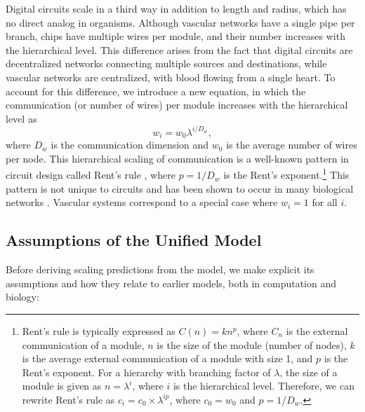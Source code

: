 \documentclass[12pt]{article}
\begin{document}
Digital circuits scale in a third way in addition to length and
radius, which has no direct 
analog in organisms. Although vascular networks have a single pipe per 
branch, chips have multiple wires per module, and their number 
increases with the hierarchical level. This difference arises from the 
fact that digital circuits are decentralized networks connecting 
multiple sources and destinations, while vascular networks are 
centralized, with blood flowing from a single heart. To account for 
this difference, we introduce a new equation, in which the 
communication (or number of wires) per module increases with the 
hierarchical level as
\begin{equation}
w_i = w_0 \lambda^{i/D_w},
\label{eq:communication}
\end{equation}
where $D_w$ is the communication dimension and $w_0$ is the average 
number of wires per node.  This hierarchical scaling of communication 
is a well-known pattern in circuit design called Rent's rule 
\cite{christie00}, where $p = 1/D_w$ is the Rent's
exponent.\footnote{Rent's rule is typically expressed as $C(n) = kn^p$, where $C_n$
  is the external communication of a module, $n$ is the size of the
  module (number of nodes), $k$ is the average external communication
  of a module with size 1, and $p$ is the Rent’s exponent. For a
  hierarchy with branching factor of $\lambda$, the size of a module is
  given as $n = \lambda^i$, where $i$ is the hierarchical
  level. Therefore, we can rewrite Rent’s rule as $c_i = c_0
  \times \lambda^{ip}$, where $c_0 = w_0$ and $p = 1 / D_w$.} This 
pattern is not unique to circuits and has been shown to occur in many 
biological networks \cite{reda09,bassett10}.   Vascular systems 
correspond to a special case where 
$w_i = 1$ for all $i$. 

\subsection{Assumptions of the Unified Model}
\label{assumptions}

Before deriving scaling predictions from the model, we make explicit
its  assumptions and how they relate to earlier models, both in
computation and biology:
\end{document}
